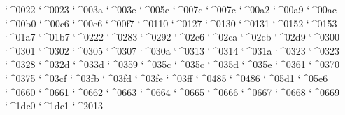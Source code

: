 \newXeTeXintercharclass \symbols   
\XeTeXcharclass `^^^^0022 \symbols
\XeTeXcharclass `^^^^0023 \symbols
\XeTeXcharclass `^^^^003a \symbols
\XeTeXcharclass `^^^^003e \symbols
\XeTeXcharclass `^^^^005e \symbols
\XeTeXcharclass `^^^^007c \symbols
\XeTeXcharclass `^^^^007c \symbols
\XeTeXcharclass `^^^^00a2 \symbols
\XeTeXcharclass `^^^^00a9 \symbols
\XeTeXcharclass `^^^^00ac \symbols
\XeTeXcharclass `^^^^00b0 \symbols
\XeTeXcharclass `^^^^00c6 \symbols
\XeTeXcharclass `^^^^00e6 \symbols
\XeTeXcharclass `^^^^00f7 \symbols
\XeTeXcharclass `^^^^0110 \symbols
\XeTeXcharclass `^^^^0127 \symbols
\XeTeXcharclass `^^^^0130 \symbols
\XeTeXcharclass `^^^^0131 \symbols
\XeTeXcharclass `^^^^0152 \symbols
\XeTeXcharclass `^^^^0153 \symbols
\XeTeXcharclass `^^^^01a7 \symbols
\XeTeXcharclass `^^^^01b7 \symbols
\XeTeXcharclass `^^^^0222 \symbols
\XeTeXcharclass `^^^^0283 \symbols
\XeTeXcharclass `^^^^0292 \symbols
\XeTeXcharclass `^^^^02c6 \symbols
\XeTeXcharclass `^^^^02ca \symbols
\XeTeXcharclass `^^^^02cb \symbols
\XeTeXcharclass `^^^^02d9 \symbols
\XeTeXcharclass `^^^^0300 \symbols
\XeTeXcharclass `^^^^0301 \symbols
\XeTeXcharclass `^^^^0302 \symbols
\XeTeXcharclass `^^^^0305 \symbols
\XeTeXcharclass `^^^^0307 \symbols
\XeTeXcharclass `^^^^030a \symbols
\XeTeXcharclass `^^^^0313 \symbols
\XeTeXcharclass `^^^^0314 \symbols
\XeTeXcharclass `^^^^031a \symbols
\XeTeXcharclass `^^^^0323 \symbols
\XeTeXcharclass `^^^^0323 \symbols
\XeTeXcharclass `^^^^0328 \symbols
\XeTeXcharclass `^^^^032d \symbols
\XeTeXcharclass `^^^^033d \symbols
\XeTeXcharclass `^^^^0359 \symbols
\XeTeXcharclass `^^^^035c \symbols
\XeTeXcharclass `^^^^035c \symbols
\XeTeXcharclass `^^^^035d \symbols
\XeTeXcharclass `^^^^035e \symbols
\XeTeXcharclass `^^^^0361 \symbols
\XeTeXcharclass `^^^^0370 \symbols
\XeTeXcharclass `^^^^0375 \symbols
\XeTeXcharclass `^^^^03cf \symbols
\XeTeXcharclass `^^^^03fb \symbols
\XeTeXcharclass `^^^^03fd \symbols
\XeTeXcharclass `^^^^03fe \symbols
\XeTeXcharclass `^^^^03ff \symbols
\XeTeXcharclass `^^^^0485 \symbols
\XeTeXcharclass `^^^^0486 \symbols
\XeTeXcharclass `^^^^05d1 \symbols
\XeTeXcharclass `^^^^05e6 \symbols
\XeTeXcharclass `^^^^0660 \symbols
\XeTeXcharclass `^^^^0661 \symbols
\XeTeXcharclass `^^^^0662 \symbols
\XeTeXcharclass `^^^^0663 \symbols
\XeTeXcharclass `^^^^0664 \symbols
\XeTeXcharclass `^^^^0665 \symbols
\XeTeXcharclass `^^^^0666 \symbols
\XeTeXcharclass `^^^^0667 \symbols
\XeTeXcharclass `^^^^0668 \symbols
\XeTeXcharclass `^^^^0669 \symbols
\XeTeXcharclass `^^^^1dc0 \symbols
\XeTeXcharclass `^^^^1dc1 \symbols
\XeTeXcharclass `^^^^2013 \symbols

